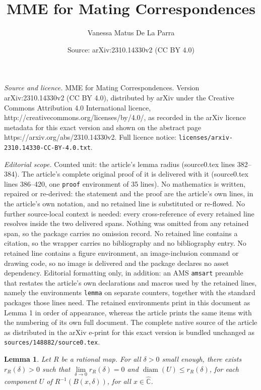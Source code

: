 \documentclass[10pt,a4paper]{amsart}
\title{MME for Mating Correspondences}
\author{Vanessa Matus De La Parra}
\date{Source: arXiv:2310.14330v2 (CC BY 4.0)}
\newtheorem{lemma}{Lemma}
\begin{document}
\maketitle

\noindent\emph{Source and licence.} MME for Mating Correspondences. Version arXiv:2310.14330v2 (CC BY 4.0), distributed by arXiv under the Creative Commons Attribution 4.0 International licence, http://creativecommons.org/licenses/by/4.0/, as recorded in the arXiv licence metadata for this exact version and shown on the abstract page https://arxiv.org/abs/2310.14330v2. Full licence notice: \texttt{licenses/arxiv-2310.14330-CC-BY-4.0.txt}.\par\smallskip

\noindent\textit{Editorial scope.} Counted unit: the article's lemma radius (source0.tex lines 382--384). The article's complete original proof of it is delivered with it (source0.tex lines 386--420, one \texttt{proof} environment of 35 lines). No mathematics is written, repaired or re-derived: the statement and the proof are the article's own lines, in the article's own notation, and no retained line is substituted or re-flowed.  No further source-local context is needed: every cross-reference of every retained line resolves inside the two delivered spans.  Nothing was omitted from any retained span, so the package carries no omission record.  No retained line contains a citation, so the wrapper carries no bibliography and no bibliography entry.  No retained line contains a figure environment, an image-inclusion command or drawing code, so no image is delivered and the package declares no asset dependency.  Editorial formatting only, in addition: an AMS \texttt{amsart} preamble that restates the article's own declarations and macros used by the retained lines, namely the environments \texttt{lemma} on separate counters, together with the standard packages those lines need.  The retained environments print in this document as Lemma 1 in order of appearance, whereas the article prints the same items with the numbering of its own full document.  The complete native source of the article as distributed in the arXiv e-print for this exact version is bundled unchanged as \texttt{sources/148882/source0.tex}.
\begin{lemma}\label{radius}
Let $R$ be a rational map. For all $\delta>0$ small enough, there exists $r_R(\delta)>0$ such that $\lim\limits_{\delta\to 0}r_R(\delta)=0$ and $\operatorname{diam}(U)\leq r_R(\delta)$, for each component $U$ of $R^{-1}(B(x,\delta))$, for all $x\in\widehat{\mathbb{C}}$.
\end{lemma}
\end{document}

